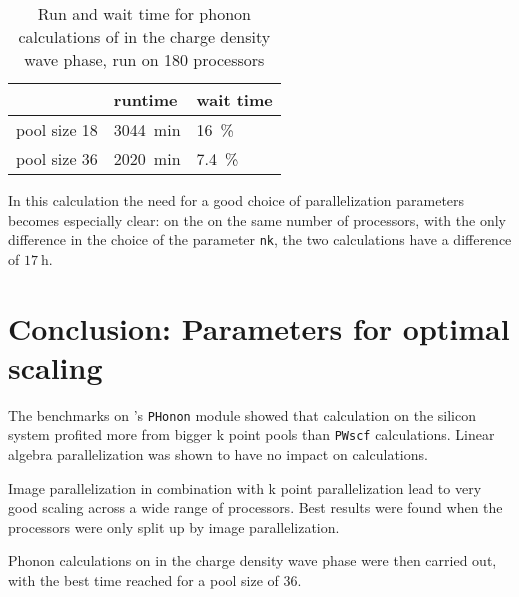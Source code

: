 \documentclass[main.tex]{subfiles}
\begin{document}
\begin{table}[ht!]
    \caption{Run and wait time for phonon calculations of \TaS in the charge density wave phase, run on 180 processors}
    \begin{tabular}{@{}lll@{}}
    \toprule
                 & runtime            & wait time \\ \midrule
    pool size 18 & \SI{3044}{\minute} & \SI{16}{\percent}         \\
    pool size 36 & \SI{2020}{\minute} & \SI{7.4}{\percent}
    \end{tabular}
    \label{tab:tas2_cdw_phonon_times}
\end{table}
In this calculation the need for a good choice of parallelization parameters becomes especially clear:
on the on the same number of processors, with the only difference in the choice of the parameter \texttt{nk}, the two calculations have a difference of \(\SI{17}{\hour}\).

\section{Conclusion: Parameters for optimal scaling}

The benchmarks on \QE's \texttt{PHonon} module showed that calculation on the silicon system profited more from bigger k point pools than \texttt{PWscf} calculations.
Linear algebra parallelization was shown to have no impact on calculations.

Image parallelization in combination with k point parallelization lead to very good scaling across a wide range of processors.
Best results were found when the processors were only split up by image parallelization.

Phonon calculations on \TaS in the charge density wave phase were then carried out, with the best time reached for a pool size of 36.
\end{document}
